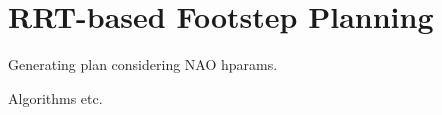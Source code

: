\chapter{RRT-based Footstep Planning}
\label{ch:rrt-based-footstep-planning}
Generating plan considering NAO hparams.

Algorithms etc.

